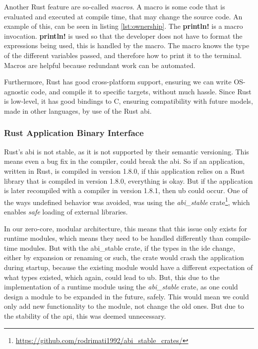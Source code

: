 Another Rust feature are so-called \textit{macros}. A macro is some code that is
evaluated and executed at compile time, that may change the source code. An
example of this, can be seen in listing \ref{lst:ownership}. The
\textbf{println!} is a macro invocation. \textbf{println!} is used so that the
developer does not have to format the expressions being used, this is handled by
the macro. The macro knows the type of the different variables passed, and
therefore how to print it to the terminal. Macros are helpful because redundant
work can be automated.

Furthermore, Rust has good cross-platform support, ensuring
we can write OS-agnostic code, and compile it to specific targets, without much
hassle. Since Rust is low-level, it has good bindings to C, ensuring
compatibility with future models, made in other languages, by use of the Rust
\gls*{abi}.

\subsubsection{Rust Application Binary Interface}

Rust's \gls*{abi} is not stable, as it is not supported by their semantic
versioning. This means even a bug fix in the compiler, could break the
\gls*{abi}. So if an application, written in Rust, is compiled in version 1.8.0,
if this application relies on a Rust library that is compiled in version 1.8.0,
everything is okay. But if the application is later recompiled with a compiler
in version 1.8.1, then \gls*{ub} could occur. One of the ways undefined behavior
was avoided, was using the \textit{abi\_stable} crate\footnote{\url{https://github.com/rodrimati1992/abi\_stable\_crates/}},
which enables \textit{safe} loading of external libraries.

In our zero-core, modular architecture, this means that this issue only exists
for runtime modules, which means they need to be handled differently than
compile-time modules. But with the abi\_stable crate, if the types in the
\gls*{ide} change, either by expansion or renaming or such, the crate would
crash the application during startup, because the existing module would have a
different expectation of what types existed, which again, could lead to
\gls*{ub}. But, this due to the implementation of a runtime module using the
\textit{abi\_stable} crate, as one could design a module to be expanded in the
future, safely. This would mean we could only add new functionality to the
module, not change the old ones. But due to the stability of the \gls*{api},
this was deemed unnecessary.

